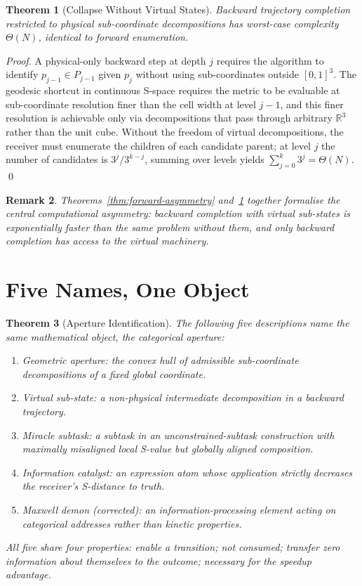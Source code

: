 \documentclass[twocolumn,a4paper]{article}
\newtheorem{theorem}{Theorem}[section]
\newtheorem{remark}[theorem]{Remark}
\newcommand{\Real}{\mathbb{R}}
\begin{document}
\begin{theorem}[Collapse Without Virtual States]
\label{thm:collapse}
Backward trajectory completion restricted to physical sub-coordinate decompositions has worst-case complexity $\Theta(N)$, identical to forward enumeration.
\end{theorem}

\begin{proof}
A physical-only backward step at depth $j$ requires the algorithm to identify $p_{j-1}\in P_{j-1}$ given $p_{j}$ without using sub-coordinates outside $[0,1]^{3}$. The geodesic shortcut in continuous S-space requires the metric to be evaluable at sub-coordinate resolution finer than the cell width at level $j-1$, and this finer resolution is achievable only via decompositions that pass through arbitrary $\Real^{3}$ rather than the unit cube. Without the freedom of virtual decompositions, the receiver must enumerate the children of each candidate parent; at level $j$ the number of candidates is $3^{j}/3^{k-j}$, summing over levels yields $\sum_{j=0}^{k}3^{j}=\Theta(N)$. \qed
\end{proof}

\begin{remark}
Theorems~\ref{thm:forward-asymmetry} and~\ref{thm:collapse} together formalise the central computational asymmetry: backward completion with virtual sub-states is exponentially faster than the same problem without them, and only backward completion has access to the virtual machinery.
\end{remark}

\section{Five Names, One Object}
\label{sec:five-names}

\begin{theorem}[Aperture Identification]
\label{thm:five-names}
The following five descriptions name the same mathematical object, the \emph{categorical aperture}:
\begin{enumerate}[nosep,label=(\arabic*)]
\item Geometric aperture: the convex hull of admissible sub-coordinate decompositions of a fixed global coordinate.
\item Virtual sub-state: a non-physical intermediate decomposition in a backward trajectory.
\item Miracle subtask: a subtask in an unconstrained-subtask construction with maximally misaligned local S-value but globally aligned composition.
\item Information catalyst: an expression atom whose application strictly decreases the receiver's S-distance to truth.
\item Maxwell demon (corrected): an information-processing element acting on categorical addresses rather than kinetic properties.
\end{enumerate}
All five share four properties: enable a transition; not consumed; transfer zero information about themselves to the outcome; necessary for the speedup advantage.
\end{theorem}
\end{document}
